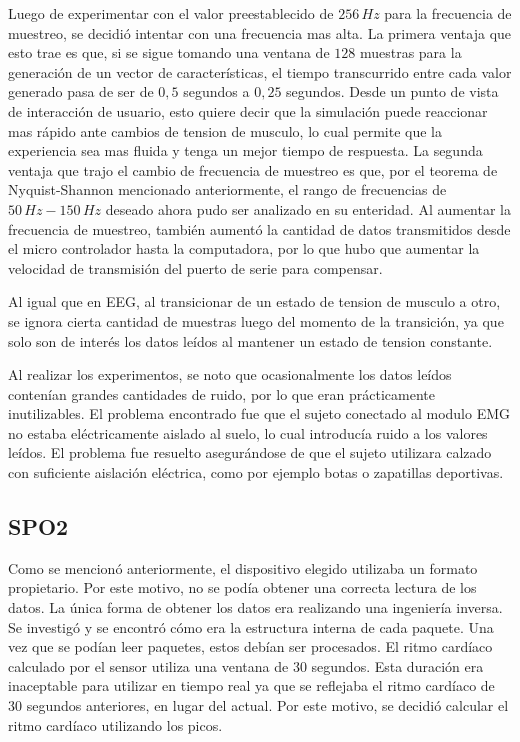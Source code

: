 Luego de experimentar con el valor preestablecido de $256\,Hz$ para la frecuencia de muestreo, se decidió intentar con una frecuencia mas alta. La primera ventaja que esto trae es que, si se sigue tomando una ventana de $128$ muestras para la generación de un vector de características, el tiempo transcurrido entre cada valor generado pasa de ser de $0,5$ segundos a $0,25$ segundos. Desde un punto de vista de interacción de usuario, esto quiere decir que la simulación puede reaccionar mas rápido ante cambios de tension de musculo, lo cual permite que la experiencia sea mas fluida y tenga un mejor tiempo de respuesta. La segunda ventaja que trajo el cambio de frecuencia de muestreo es que, por el teorema de Nyquist-Shannon mencionado anteriormente, el rango de frecuencias de $50 \, Hz-150 \, Hz$ deseado ahora pudo ser analizado en su enteridad. Al aumentar la frecuencia de muestreo, también aumentó la cantidad de datos transmitidos desde el micro controlador hasta la computadora, por lo que hubo que aumentar la velocidad de transmisión del puerto de serie para compensar.

Al igual que en EEG, al transicionar de un estado de tension de musculo a otro, se ignora cierta cantidad de muestras luego del momento de la transición, ya que solo son de interés los datos leídos al mantener un estado de tension constante. 

Al realizar los experimentos, se noto que ocasionalmente los datos leídos contenían grandes cantidades de ruido, por lo que eran prácticamente inutilizables. El problema encontrado fue que el sujeto conectado al modulo EMG no estaba eléctricamente aislado al suelo, lo cual introducía ruido a los valores leídos. El problema fue resuelto asegurándose de que el sujeto utilizara calzado con suficiente aislación eléctrica, como por ejemplo botas o zapatillas deportivas.

\subsection{SPO2}

Como se mencionó anteriormente, el dispositivo elegido utilizaba un formato propietario. Por este motivo, no se podía obtener una correcta lectura de los datos. La única forma de obtener los datos era realizando una ingeniería inversa. Se investigó y se encontró  cómo era la estructura interna de cada paquete. Una vez que se podían leer paquetes, estos debían ser procesados. El ritmo cardíaco calculado por el sensor utiliza una ventana de 30 segundos. Esta duración era inaceptable para utilizar en tiempo real ya que se reflejaba el ritmo cardíaco de 30 segundos anteriores, en lugar del actual. Por este motivo, se decidió calcular el ritmo cardíaco utilizando los picos.

